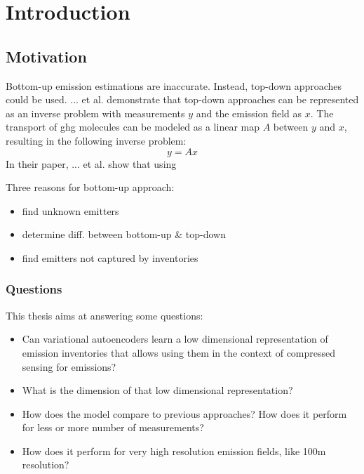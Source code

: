 
\chapter{Introduction}\label{chapter:introduction}

\section{Motivation}
Bottom-up emission estimations are inaccurate.
Instead, top-down approaches could be used.
... et al. demonstrate that top-down approaches can be represented as an inverse problem with measurements $y$ and the emission field as $x$.
The transport of ghg molecules can be modeled as a linear map $A$ between $y$ and $x$, resulting in the following inverse problem:
\begin{equation}
	y = Ax
\end{equation}
In their paper, ... et al. show that using

Three reasons for bottom-up approach:
\begin{itemize}
	\item find unknown emitters
	\item determine diff. between bottom-up \& top-down
	\item find emitters not captured by inventories
\end{itemize}

\subsection{Questions}
This thesis aims at answering some questions:
\begin{itemize}
	\item Can variational autoencoders learn a low dimensional representation of emission inventories that allows using them in the context of compressed sensing for emissions?
	\item What is the dimension of that low dimensional representation?
	\item How does the model compare to previous approaches? How does it perform for less or more number of measurements?
	\item How does it perform for very high resolution emission fields, like 100m resolution?
\end{itemize}